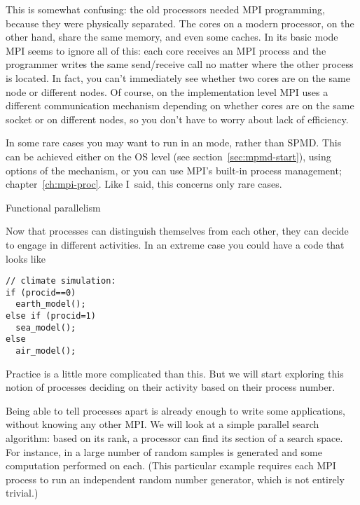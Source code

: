 This is somewhat confusing: the old processors needed MPI programming, because
they were physically separated. The cores on a modern processor, on the other hand,
share the same memory, and even some caches. In its basic mode MPI
seems to ignore all
of this: each core receives an MPI process and the programmer writes the same send/receive call no matter
where the other process is located. In fact, you can't immediately see
whether two cores are on the same node or different nodes. Of course,
on the implementation level MPI uses a different communication
mechanism depending on whether  cores are on the same socket or on
different nodes, so you don't have to worry about lack of efficiency.

\begin{remark}
  In some rare cases you may want to run in an  mode, rather
  than \ac{SPMD}. This can be achieved either on the \ac{OS} level
  (see section~\ref{sec:mpmd-start}),
  using options of the  mechanism, or you can use
  MPI's built-in process management; chapter~\ref{ch:mpi-proc}. Like
  I~said, this concerns only rare cases.
\end{remark}





 {Functional parallelism}

Now that processes can distinguish themselves from each other,
they can decide to engage in different activities.
In an extreme case you could have a code that looks like
\begin{lstlisting}
// climate simulation:
if (procid==0)
  earth_model();
else if (procid=1)
  sea_model();
else
  air_model();
\end{lstlisting}
Practice is a little more complicated than this. But we will start
exploring this notion of processes deciding on their activity
based on their process number.

Being able to tell processes apart is already enough to write some
applications, without knowing any other MPI.
We will look at a simple parallel search algorithm:
based on its rank, a processor can find its section of
a search space.  For instance, in  a
large number of random samples is generated and some computation
performed on each. (This particular example requires each MPI process
to run an independent random number generator, which is not entirely
trivial.)

